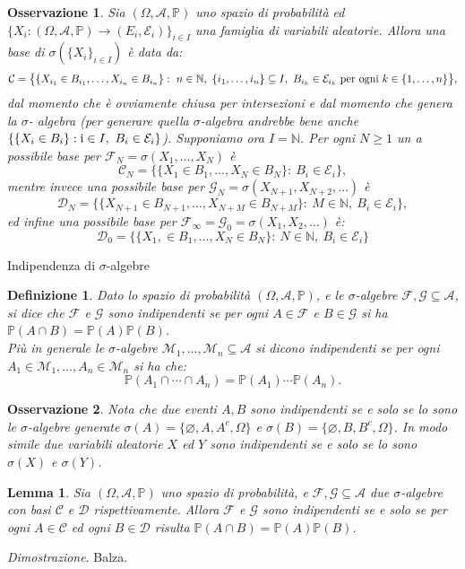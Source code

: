 \documentclass[11pt]{book}
\makeatletter
\theoremstyle{Definizione}
\newtheorem*{mydef}{Definizione}
\theoremstyle{TeoremaProposizioneLemmaCorollario}
\newtheorem{mylem}[myteo]{Lemma}
\theoremstyle{OsservazioneNota}
\newtheorem{myobs}{Osservazione}[section]
\renewenvironment{proof}[1][\proofname]{\par
  \normalfont \topsep6\p@\@plus6\p@\relax
  \trivlist
  \item[\hskip\labelsep
        \itshape
    #1\@addpunct{.}]\ignorespaces
}{%
  \endtrivlist\@endpefalse
}
\newcommand{\N}{\mathbb{N}}
\renewcommand{\P}{\mathbb{P}}
\renewcommand{\i}{\textup{i}}
\renewenvironment{proof}{\textsl{Dimostrazione}.}{}
\makeatother
\begin{document}
\begin{myobs}
Sia $(\Omega,\mathcal{A},\P)$ uno spazio di probabilità ed $\{X_i:(\Omega,\mathcal{A},\P) \longrightarrow (E_i,\mathcal{E}_i)\}_{i\in I}$ una famiglia di variabili aleatorie. Allora una base di $\sigma(\{X_i\}_{i\in I})$ è data da:
$$
\mathcal{C}= \big\{\{X_{i_1}\in B_{i_1},\dots,X_{i_n}\in B_{i_n}\}:\ n\in \N,\ \{i_1,\dots,i_n\}\subseteq I,\ B_{i_k}\in \mathcal{E}_{i_k}\textup{ per ogni }k\in \{1,\dots,n\}\big\},
$$
dal momento che è ovviamente chiusa per intersezioni e dal momento che genera la $\sigma$- algebra (per generare quella $\sigma$-algebra andrebbe bene anche $\{\{X_i\in B_i\}:\i\in I,\ B_i\in \mathcal{E}_i\}$). Supponiamo ora $I = \N$. Per ogni $N \geq 1$ un a possibile base per $\mathcal{F}_N = \sigma(X_1,\dots,X_N)$ è 
$$
\mathcal{C}_N = \big\{\{X_1\in B_1,\dots,X_N\in B_N\}:\ B_i\in \mathcal{E}_i\big\},
$$
mentre invece una possibile base per $\mathcal{G}_N = \sigma(X_{N+1},X_{N+2},\dots)$ è 
$$
\mathcal{D}_N = \big\{ \{X_{N+1}\in B_{N+1},\dots,X_{N+M}\in B_{N+M}\}:\ M\in \N,\ B_i\in \mathcal{E}_i\big\},
$$
ed infine una possibile base per $\mathcal{F}_\infty = \mathcal{G}_0 = \sigma(X_1,X_2,\dots)$ è:
$$
\mathcal{D}_0 = \big\{ \{X_1,\in B_1,\dots,X_N\in B_N\}:\ N\in \N,\ B_i\in \mathcal{E}_i\big\}
$$
\end{myobs}
\begin{boxdef}{Indipendenza di $\sigma$-algebre}
\begin{mydef}
Dato lo spazio di probabilità $(\Omega,\mathcal{A},\P)$, e le $\sigma$-algebre $\mathcal{F},\mathcal{G}\subseteq \mathcal{A}$, si dice che $\mathcal{F}$ e $\mathcal{G}$ sono indipendenti se per ogni $A\in \mathcal{F}$ e $B\in \mathcal{G}$ si ha $\P(A\cap B) = \P(A)\P(B)$.\\
Più in generale le $\sigma$-algebre $\mathcal{M}_1,\dots,\mathcal{M}_n\subseteq \mathcal{A}$ si dicono indipendenti se per ogni $A_1\in \mathcal{M}_1,\dots,A_n\in \mathcal{M}_n$ si ha che:
$$
\P(A_1\cap \cdots \cap A_n) = \P(A_1)\cdots\P(A_n).
$$
\end{mydef}
\end{boxdef}
\begin{myobs}
Nota che due eventi $A,B$ sono indipendenti se e solo se lo sono le $\sigma$-algebre generate $\sigma(A) = \{\varnothing,A,A^c,\Omega\}$ e $\sigma(B) = \{\varnothing, B,B^c,\Omega\}$. In modo simile due variabili aleatorie $X$ ed $Y$ sono indipendenti se e solo se lo sono $\sigma(X)$ e $\sigma(Y)$.
\end{myobs}
\begin{boxoss}
\begin{mylem}
Sia $(\Omega,\mathcal{A},\P)$ uno spazio di probabilità, e $\mathcal{F},\mathcal{G}\subseteq \mathcal{A}$ due $\sigma$-algebre con basi $\mathcal{C}$ e $\mathcal{D}$ rispettivamente. Allora $\mathcal{F}$ e $\mathcal{G}$ sono indipendenti se e solo se per ogni $A\in \mathcal{C}$ ed ogni $B\in \mathcal{D}$ risulta $\P(A\cap B) = \P(A)\P(B)$.
\end{mylem}
\tcblower
\begin{proof}
Balza.
\end{proof}
\end{boxoss}
\end{document}
